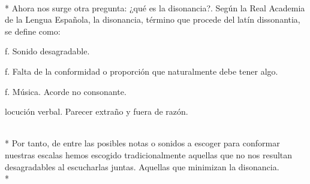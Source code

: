 \documentclass[11pt,a4paper]{article}
\begin{document}
\\*
Ahora nos surge otra pregunta: ¿qué es la disonancia?. Según la Real Academia de la Lengua Española, la disonancia, término que procede del latín dissonantia, se define como:

\begin{textsl}

    \item f. Sonido desagradable.
    \item f. Falta de la conformidad o proporción que naturalmente debe tener algo.
    \item f. Música. Acorde no consonante.
    \item locución verbal. Parecer extraño y fuera de razón.

\end{textsl}
\\*
\vspace{.80cm}
Por tanto, de entre las posibles notas o sonidos a escoger para conformar nuestras escalas hemos escogido tradicionalmente aquellas que no nos resultan desagradables al escucharlas juntas. Aquellas que minimizan la disonancia.\\*
\end{document}
